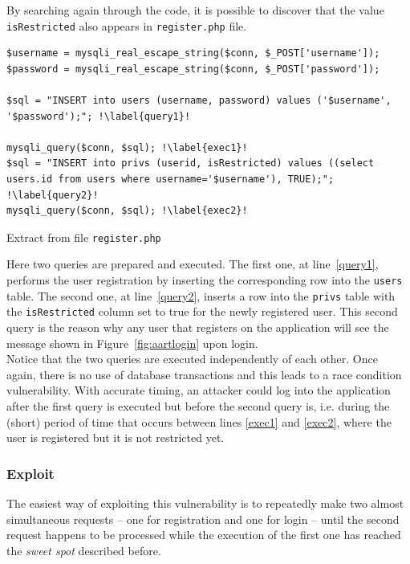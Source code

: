 By searching again through the code, it is possible to discover that the value \texttt{isRestricted} also appears in \texttt{register.php} file.

\begin{listing}[H]
\begin{verbatim}
$username = mysqli_real_escape_string($conn, $_POST['username']);
$password = mysqli_real_escape_string($conn, $_POST['password']);

$sql = "INSERT into users (username, password) values ('$username', '$password');"; !\label{query1}!

mysqli_query($conn, $sql); !\label{exec1}!
$sql = "INSERT into privs (userid, isRestricted) values ((select users.id from users where username='$username'), TRUE);"; !\label{query2}!
mysqli_query($conn, $sql); !\label{exec2}!
\end{verbatim}
\caption{Extract from file \texttt{register.php}}
\end{listing}

Here two queries are prepared and executed. The first one, at line~\ref{query1}, performs the user registration by inserting the corresponding row into the \texttt{users} table. The second one, at line~\ref{query2}, inserts a row into the \texttt{privs} table with the \texttt{isRestricted} column set to true for the newly registered user. This second query is the reason why any user that registers on the application will see the message shown in Figure~\ref{fig:aartlogin} upon login. \\

Notice that the two queries are executed independently of each other. Once again, there is no use of database transactions and this leads to a race condition vulnerability. With accurate timing, an attacker could log into the application after the first query is executed but before the second query is, i.e.  during the (short) period of time that occurs between lines \ref{exec1} and \ref{exec2}, where the user is registered but it is not restricted yet. \\

\subsubsection{Exploit}

The easiest way of exploiting this vulnerability is to repeatedly make two almost simultaneous requests -- one for registration and one for login -- until the second request happens to be processed while the execution of the first one has reached the \textit{sweet spot} described before.

